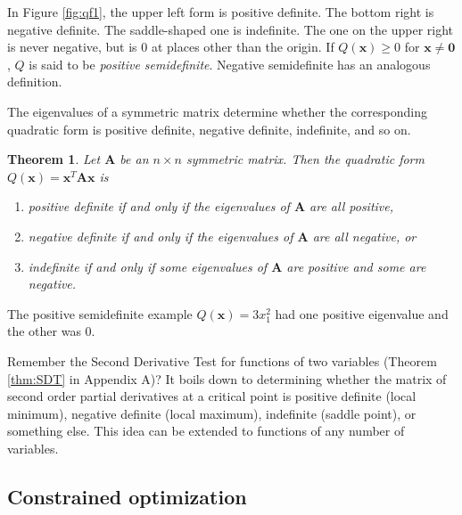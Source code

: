 \documentclass[
]{book}
\newtheorem{theorem}{Theorem}[chapter]
\theoremstyle{definition}
\theoremstyle{definition}
\theoremstyle{definition}
\theoremstyle{definition}
\theoremstyle{remark}
\begin{document}
In Figure \ref{fig:qf1}, the upper left form is positive definite. The bottom right is negative definite. The saddle-shaped one is indefinite. The one on the upper right is never negative, but is 0 at places other than the origin. If \(Q(\mathbf{x})\geq 0\) for \(\mathbf{x}\neq \mathbf{0}\), \(Q\) is said to be \emph{positive semidefinite}. Negative semidefinite has an analogous definition.

The eigenvalues of a symmetric matrix determine whether the corresponding quadratic form is positive definite, negative definite, indefinite, and so on.

\begin{theorembox}

\begin{theorem}

Let \(\mathbf{A}\) be an \(n\times n\) symmetric matrix. Then the quadratic form \(Q(\mathbf{x})=\mathbf{x}^T\mathbf{A}\mathbf{x}\) is

\begin{enumerate}
\def\labelenumi{\arabic{enumi}.}
\item
  positive definite if and only if the eigenvalues of \(\mathbf{A}\) are all positive,
\item
  negative definite if and only if the eigenvalues of \(\mathbf{A}\) are all negative, or
\item
  indefinite if and only if some eigenvalues of \(\mathbf{A}\) are positive and some are negative.
\end{enumerate}

\end{theorem}

\end{theorembox}

The positive semidefinite example \(Q(\mathbf{x})=3x_1^2\) had one positive eigenvalue and the other was 0.

\begin{notebox}
Remember the Second Derivative Test for functions of two variables (Theorem \ref{thm:SDT} in Appendix A)? It boils down to determining whether the matrix of second order partial derivatives at a critical point is positive definite (local minimum), negative definite (local maximum), indefinite (saddle point), or something else. This idea can be extended to functions of any number of variables.

\end{notebox}

\subsection*{Constrained optimization}\label{constrained-optimization}
\end{document}
